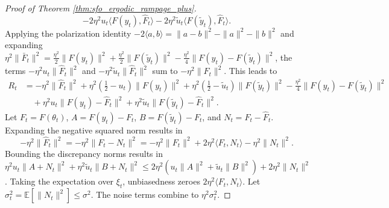 \documentclass[letter,11pt]{article}
\begin{document}
\begin{proof}[Proof of Theorem \ref{thm:sfo_ergodic_rampage_plus}]
\begin{equation}
-2\eta^2 u_t \langle F(y_t), \hat{F}_t \rangle - 2\eta^2 \tilde{u}_t \langle F(\tilde{y}_t), \hat{F}_t \rangle.
\end{equation}
Applying the polarization identity $-2\langle a, b \rangle = \|a-b\|^2 - \|a\|^2 - \|b\|^2$ and expanding $\eta^2\|\bar{F}_t\|^2 = \frac{\eta^2}{2}\|F(y_t)\|^2 + \frac{\eta^2}{2}\|F(\tilde{y}_t)\|^2 - \frac{\eta^2}{4}\|F(y_t) - F(\tilde{y}_t)\|^2$, the terms $-\eta^2 u_t \|\hat{F}_t\|^2$ and $-\eta^2 \tilde{u}_t \|\hat{F}_t\|^2$ sum to $-\eta^2 \|\hat{F}_t\|^2$. This leads to
\begin{equation} \label{eq:sfo_ramp_variance_block}
\begin{aligned}
R_t &= -\eta^2 \|\hat{F}_t\|^2 + \eta^2\left(\frac{1}{2} - u_t\right)\|F(y_t)\|^2 + \eta^2\left(\frac{1}{2} - \tilde{u}_t\right)\|F(\tilde{y}_t)\|^2 - \frac{\eta^2}{4}\|F(y_t) - F(\tilde{y}_t)\|^2 \\
&\quad + \eta^2 u_t \|F(y_t) - \hat{F}_t\|^2 + \eta^2 \tilde{u}_t \|F(\tilde{y}_t) - \hat{F}_t\|^2.
\end{aligned}
\end{equation}
Let $F_t = F(\theta_t)$, $A = F(y_t) - F_t$, $B = F(\tilde{y}_t) - F_t$, and $N_t = F_t - \hat{F}_t$. Expanding the negative squared norm results in
\begin{equation}
-\eta^2 \|\hat{F}_t\|^2 = -\eta^2 \|F_t - N_t\|^2 = -\eta^2 \|F_t\|^2 + 2\eta^2 \langle F_t, N_t \rangle - \eta^2 \|N_t\|^2.
\end{equation}
Bounding the discrepancy norms results in $\eta^2 u_t \|A + N_t\|^2 + \eta^2 \tilde{u}_t \|B + N_t\|^2 \le 2\eta^2 (u_t \|A\|^2 + \tilde{u}_t \|B\|^2) + 2\eta^2 \|N_t\|^2$. Taking the expectation over $\xi_t$, unbiasedness zeroes $2\eta^2 \langle F_t, N_t \rangle$. Let $\sigma_t^2 = \mathbb{E}[\|N_t\|^2] \le \sigma^2$. The noise terms combine to $\eta^2 \sigma_t^2$.


\end{proof}
\end{document}
